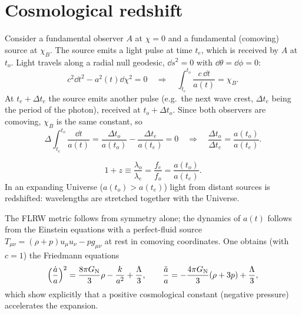 \section{Cosmological redshift}
Consider a fundamental observer $A$ at $\chi=0$ and a fundamental (comoving) source at $\chi_B$. The source emits a light pulse at time $t_e$, which is received by $A$ at $t_o$. Light travels along a radial null geodesic, $\dd s^2=0$ with $\dd\theta=\dd\phi=0$:
\[
  c^2\dd t^2-a^2(t)\dd\chi^2=0\quad\Longrightarrow\quad\int_{t_e}^{t_o}\frac{c\,\dd t}{a(t)}=\chi_B .
\]
At $t_e+\Delta t_e$ the source emits another pulse (e.g.\ the next wave crest, $\Delta t_e$ being the period of the photon), received at $t_o+\Delta t_o$. Since both observers are comoving, $\chi_B$ is the same constant, so
\[
  \Delta\int_{t_e}^{t_o}\frac{\dd t}{a(t)}=\frac{\Delta t_o}{a(t_o)}-\frac{\Delta t_e}{a(t_e)}=0
  \quad\Longrightarrow\quad\frac{\Delta t_o}{\Delta t_e}=\frac{a(t_o)}{a(t_e)} .
\]
\begin{keyresult}
\begin{equation}
  1+z\equiv\frac{\lambda_o}{\lambda_e}=\frac{f_e}{f_o}=\frac{a(t_o)}{a(t_e)}.
\end{equation}
In an expanding Universe ($a(t_o)>a(t_e)$) light from distant sources is redshifted: wavelengths are stretched together with the Universe.
\end{keyresult}

\begin{remarkbox}
The FLRW metric follows from symmetry alone; the dynamics of $a(t)$ follows from the Einstein equations with a perfect-fluid source $T_{\mu\nu}=(\rho+p)u_\mu u_\nu-pg_{\mu\nu}$ at rest in comoving coordinates. One obtains (with $c=1$) the Friedmann equations
\[
  \Big(\frac{\dot a}{a}\Big)^2=\frac{8\pi G_{\mathrm N}}{3}\rho-\frac{k}{a^2}+\frac\Lambda3,\qquad
  \frac{\ddot a}{a}=-\frac{4\pi G_{\mathrm N}}{3}(\rho+3p)+\frac\Lambda3,
\]
which show explicitly that a positive cosmological constant (negative pressure) accelerates the expansion.
\end{remarkbox}
